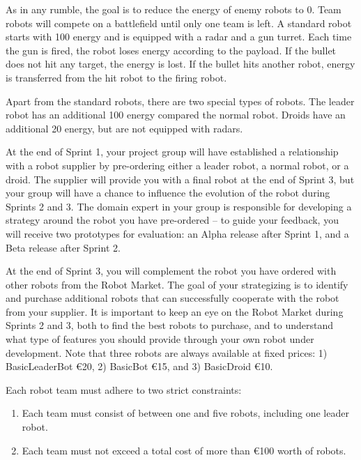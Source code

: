 \documentclass{scrreprt}
\begin{document}
As in any rumble, the goal is to reduce the energy of enemy robots to 0. Team robots will compete on a battlefield until only one team is left. A standard robot starts with 100 energy and is equipped with a radar and a gun turret. Each time the gun is fired, the robot loses energy according to the payload. If the bullet does not hit any target, the energy is lost. If the bullet hits another robot, energy is transferred from the hit robot to the firing robot.

Apart from the standard robots, there are two special types of robots. The leader robot has an additional 100 energy compared the normal robot. Droids have an additional 20 energy, but are not equipped with radars.

At the end of Sprint 1, your project group will have established a relationship with a robot supplier by pre-ordering either a leader robot, a normal robot, or a droid. The supplier will provide you with a final robot at the end of Sprint 3, but your group will have a chance to influence the evolution of the robot during Sprints 2 and 3. The domain expert in your group is responsible for developing a strategy around the robot you have pre-ordered -- to guide your feedback, you will receive two prototypes for evaluation: an Alpha release after Sprint 1, and a Beta release after Sprint 2.

At the end of Sprint 3, you will complement the robot you have ordered with other robots from the Robot Market. The goal of your strategizing is to identify and purchase additional robots that can successfully cooperate with the robot from your supplier. It is important to keep an eye on the Robot Market during Sprints 2 and 3, both to find the best robots to purchase, and to understand what type of features you should provide through your own robot under development. Note that three robots are always available at fixed prices: 1) BasicLeaderBot \euro 20, 2) BasicBot \euro 15, and 3) BasicDroid \euro 10.

Each robot team must adhere to two strict constraints: 

\begin{enumerate}
\item Each team must consist of between one and five robots, including one leader robot.
\item Each team must not exceed a total cost of more than \euro 100 worth of robots.
\end{enumerate}
\end{document}
